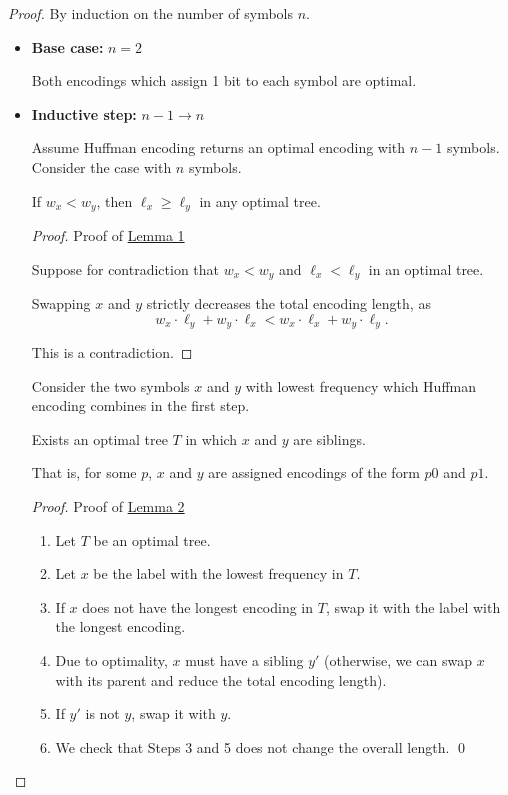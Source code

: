 \begin{proof}
    By induction on the number of symbols $n$.

    \begin{itemize}
        \item \textbf{Base case:} $n = 2$

        Both encodings which assign 1 bit to each symbol are optimal.

        \item \textbf{Inductive step:} $n - 1 \to n$

        Assume Huffman encoding returns an optimal encoding with $n - 1$ symbols. Consider the case with $n$ symbols.

        \begin{lemma*}[1]\label{lem:huffman-1}
            If $w_x < w_y$, then $\ell_x \ge \ell_y$ in any optimal tree.
        \end{lemma*}

        \begin{proof}
            Proof of \hyperref[lem:huffman-1]{Lemma 1}

            Suppose for contradiction that $w_x < w_y$ and $\ell_x < \ell_y$ in an optimal tree.

            Swapping $x$ and $y$ strictly decreases the total encoding length, as \[
                w_x \cdot \ell_y + w_y \cdot \ell_x < w_x \cdot \ell_x + w_y \cdot \ell_y.
            \]

            This is a contradiction.
        \end{proof}

        Consider the two symbols $x$ and $y$ with lowest frequency which Huffman encoding combines in the first step.

        \begin{lemma*}[2]\label{lem:huffman-2}
            Exists an optimal tree $T$ in which $x$ and $y$ are siblings.

            That is, for some $p$, $x$ and $y$ are assigned encodings of the form $p0$ and $p1$.
        \end{lemma*}

        \textit{Proof.}
            Proof of \hyperref[lem:huffman-2]{Lemma 2}

            \begin{enumerate}
                \item Let $T$ be an optimal tree.
                \item Let $x$ be the label with the lowest frequency in $T$.
                \item If $x$ does not have the longest encoding in $T$, swap it with the label with the longest encoding.
                \item Due to optimality, $x$ must have a sibling $y'$ (otherwise, we can swap $x$ with its parent and reduce the total encoding length).
                \item If $y'$ is not $y$, swap it with $y$.
                \item We check that Steps 3 and 5 does not change the overall length. \qed
            \end{enumerate}


\end{itemize}
\end{proof}
